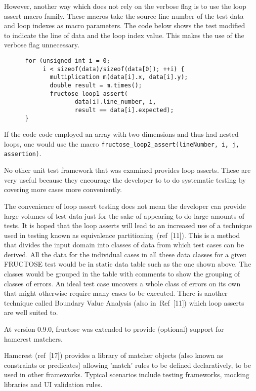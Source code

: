 \documentclass{book}
\begin{document}
However, another way which does not rely on the verbose flag
is to use the loop assert macro family. These macros take
the source line number of the test data and loop indexes
as macro parameters. The code below shows the test modified
to indicate the line of data and the loop index value.
This makes the use of the verbose flag unnecessary.
\begin{verbatim}
      for (unsigned int i = 0; 
           i < sizeof(data)/sizeof(data[0]); ++i) {
             multiplication m(data[i].x, data[i].y);
             double result = m.times();
             fructose_loop1_assert(
                    data[i].line_number, i,
                    result == data[i].expected);
      }
\end{verbatim}
If the code code employed an array with two dimensions
and thus had nested loops, one would use the macro
{\tt fructose\_loop2\_assert(lineNumber, i, j, assertion)}.

No other unit test framework that was examined provides loop asserts.
These are very useful because they encourage the developer to 
to do systematic testing by covering more cases more conveniently.

The convenience of loop assert testing does not mean the
developer can provide large volumes of test data just for the
sake of appearing to do large amounts of tests.
It is hoped that the loop asserts will lead to an increased
use of a technique used in testing known as equivalence
partitioning~(ref~[11]). This is a method that divides the input
domain into classes of data from which test cases can be derived.
All the data for the individual cases in all these data classes
for a given FRUCTOSE test would be in static data table such as
the one shown above. The classes would be grouped in the table
with comments to show the grouping of classes of errors.
An ideal test case uncovers a whole class of errors on its own
that might otherwise require many cases to be executed.
There is another technique called Boundary Value Analysis
(also in~Ref~[11]) which loop asserts are well suited to.

\label{hamcrest}

At version 0.9.0, fructose was extended to provide (optional)
support for hamcrest matchers.

Hamcrest (ref~[17])
provides a library of matcher objects (also known as constraints or predicates) 
allowing 'match' rules to be defined declaratively, to be used in other frameworks. 
Typical scenarios include testing frameworks, mocking libraries and UI validation rules.
\end{document}
